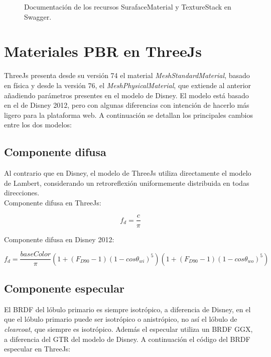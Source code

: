   \begin{figure}[H]
    \vspace{0.5cm}
    \centering
    \caption{Documentaci\'on de los recursos SurafaceMaterial y TextureStack en Swagger.}
    \vspace{0.5cm}
  \end{figure}


  \section{Materiales PBR en ThreeJs}

  ThreeJs presenta desde su versi\'on 74 el material \textit{MeshStandardMaterial}, basado en f\'isica y desde la versi\'on
  76, el \textit{MeshPhysicalMaterial}, que extiende al anterior a\~nadiendo par\'ametros presentes en el modelo de Disney.
  El modelo est\'a basado en el de Disney 2012, pero con algunas diferencias con intenci\'on de hacerlo m\'as ligero
  para la plataforma web. A continuaci\'on se detallan los principales cambios entre los dos modelos:

    \subsection{Componente difusa}
    Al contrario que en Disney, el modelo de ThreeJs utiliza directamente el modelo de Lambert, considerando un retroreflexi\'on
    uniformemente distribuida en todas direcciones.\\

    Componente difusa en ThreeJs:

    \begin{equation}
      f_d = \frac{c}{\pi}
    \end{equation}
    \singlespacing

    Componente difusa en Disney 2012:

    \begin{equation}
      f_d = \frac{baseColor}{\pi}
      \left(  1 + (F_{D90} - 1)(1 - cos\theta_{wi})^5  \right)
      \left(  1 + (F_{D90} - 1)(1 - cos\theta_{wo})^5  \right)
    \end{equation}
    \singlespacing


    \subsection{Componente especular}
    El BRDF del l\'obulo primario es siempre isotr\'opico, a diferencia de Disney, en el que el l\'obulo primario
    puede ser isotr\'opico o anistr\'opico, no as\'i el l\'obulo de \textit{clearcoat}, que siempre es isotr\'opico.
    Adem\'as el especular utiliza un BRDF GGX, a diferencia del GTR del modelo de Disney. A continuaci\'on el c\'odigo
    del BRDF especular en ThreeJs:

